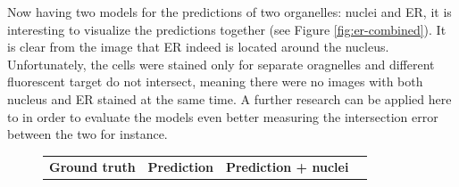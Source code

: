 Now having two models for the predictions of two organelles: nuclei and ER, it is interesting to visualize the predictions together (see Figure \ref{fig:er-combined}). It is clear from the image that ER indeed is located around the nucleus. Unfortunately, the cells were stained only for separate oragnelles and different fluorescent target do not intersect, meaning there were no images with both nucleus and ER stained at the same time. A further research can be applied here to in order to evaluate the models even better measuring the intersection error between the two for instance.
\begin{figure}[htb]
    \centering
    \centering
        \begin{tabularx}{\textwidth}{YYYY}
            \textbf{Ground truth} &
            \textbf{Prediction} &
            \textbf{Prediction + nuclei} \\

\end{tabularx}
\end{figure}
